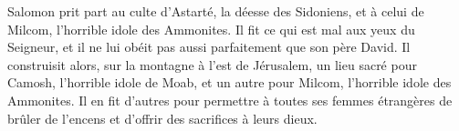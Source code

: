 Salomon prit part au culte d’Astarté, la déesse des Sidoniens,
	et à celui de Milcom, l’horrible idole des Ammonites.
Il fit ce qui est mal aux yeux du Seigneur,
	et il ne lui obéit pas aussi parfaitement que son père David.
Il construisit alors, sur la montagne à l’est de Jérusalem,
	un lieu sacré pour Camosh, l’horrible idole de Moab,
	et un autre pour Milcom, l’horrible idole des Ammonites.
Il en fit d’autres pour permettre à toutes ses femmes étrangères de brûler de l’encens
		et d’offrir des sacrifices à leurs dieux.
